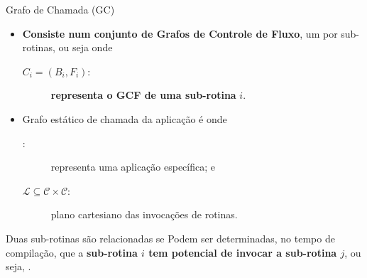       \begin{frame}{Grafo de Chamada (GC)}
   
         \begin{itemize}
            \setlength{\itemsep}{0.6em}
            \item \textbf{Consiste num conjunto de Grafos de Controle de Fluxo}, um por sub-rotinas, ou seja
            onde 
            \begin{description}
               \item[$ C_i = (B_i, F_i) $:] \textbf{representa o GCF de uma sub-rotina} $ i $.
            \end{description}
   
            \item Grafo estático de chamada da aplicação é  onde
            \begin{description}
               \item [\A:] representa uma aplicação específica; e
               \item [$ \mathcal{L} \subseteq \mathcal{C} \times \mathcal{C} $:] plano cartesiano das invocações de rotinas.
            \end{description}
   
         \end{itemize}
   
         \begin{block}{Duas sub-rotinas são relacionadas se}
            Podem ser determinadas, no tempo de compilação, que a \textbf{sub-rotina $ i $ tem potencial de invocar a sub-rotina $ j $}, ou seja, .
         \end{block}
      \end{frame}
   
